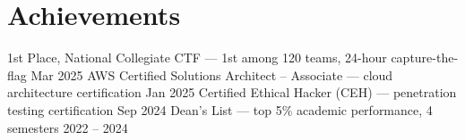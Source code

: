\section{\textbf{Achievements}}
\resumeSubHeadingListStart
    \resumeCompactEntry
        {1st Place, National Collegiate CTF }
        {— 1st among 120 teams, 24-hour capture-the-flag}
        {Mar 2025}
    \resumeCompactEntry
        {AWS Certified Solutions Architect -- Associate }
        {— cloud architecture certification}
        {Jan 2025}
    \resumeCompactEntry
        {Certified Ethical Hacker (CEH) }
        {— penetration testing certification}
        {Sep 2024}
    \resumeCompactEntry
        {Dean's List }
        {— top 5\% academic performance, 4 semesters}
        {2022 -- 2024}
\resumeSubHeadingListEnd
\vspace{-5mm}
